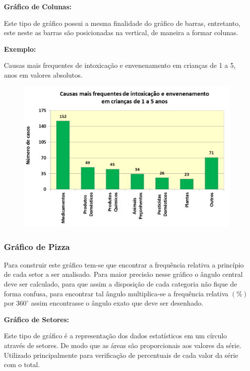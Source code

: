 \documentclass[
	12pt,				%
	oneside,			%
	a4paper,			%
	english,			%
	french,				%
	spanish,			%
	brazil,				%
	]{abntex2}
\begin{document}
\textbf{Gráfico de Colunas:}

Este tipo de gráfico possui a mesma finalidade do gráfico de barras, entretanto, este neste as barras são posicionadas na vertical, de maneira a formar colunas.

\textbf{Exemplo:} 

Causas mais frequentes de intoxicação e envenenamento em crianças de 1 a 5, anos em valores absolutos.

\begin{figure}[H]
\begin{center}

\includegraphics[scale=0.8]{grafico2.jpg}  

\end{center}
\end{figure}

\subsubsection{Gráfico de Pizza}

Para construir este gráfico tem-se que encontrar a frequência relativa a princípio de cada setor a ser analisado.\cite{variaveis3} Para maior precisão nesse gráfico o ângulo central deve ser calculado, para que assim a disposição de cada categoria não fique de forma confusa, para encontrar tal ângulo multiplica-se a frequência relativa $(\%)$ por $360^{\circ}$ assim encontrasse o ângulo exato que deve ser desenhado.

\textbf{Gráfico de Setores:}

Este tipo de gráfico é a representação dos dados estatísticos em um círculo através de setores. De modo que as áreas são proporcionais aos valores da série. Utilizado principalmente para verificação de percentuais de cada valor da série com o total.\cite{variaveis4}
\end{document}

